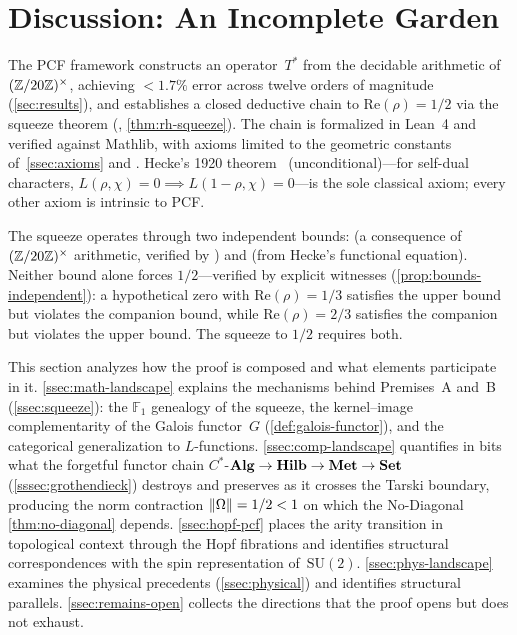 

\section{Discussion: An Incomplete Garden}\label{sec:discussion}

The PCF framework constructs an operator~$T^*$ from the decidable
arithmetic of~$(\mathbb{Z}/20\mathbb{Z})^\times$, achieving ${}<1.7\%$ error across twelve orders of
magnitude (\cref{sec:results}), and establishes a closed
deductive chain to $\mathrm{Re}(\rho)=1/2$ via the squeeze theorem
(, \cref{thm:rh-squeeze}).  The chain is formalized in Lean~4 and verified against Mathlib, with axioms limited to the geometric constants of~\cref{ssec:axioms} and . Hecke's 1920
theorem~\cite{hecke20} (unconditional)---for self-dual
characters, $L(\rho,\chi)=0\implies L(1-\rho,\chi)=0$---is
the sole classical axiom; every other axiom is intrinsic to PCF.

The squeeze operates through two independent bounds: 
(a consequence of $(\mathbb{Z}/20\mathbb{Z})^\times$ arithmetic, verified by ) and
 (from Hecke's functional equation).  Neither
bound alone forces $1/2$---verified by explicit witnesses
(\cref{prop:bounds-independent}): a hypothetical zero with
$\mathrm{Re}(\rho)=1/3$ satisfies the upper bound but violates the
companion bound, while $\mathrm{Re}(\rho)=2/3$ satisfies the companion
but violates the upper bound.  The squeeze to $1/2$ requires both.

This section analyzes how the proof is composed and what elements
participate in it.  \cref{ssec:math-landscape} explains the
mechanisms behind Premises~A and~B (\cref{ssec:squeeze}): the
$\mathbb{F}_1$ genealogy of the squeeze, the kernel--image
complementarity of the Galois functor~$G$
(\cref{def:galois-functor}), and the categorical
generalization to $L$-functions.
\cref{ssec:comp-landscape} quantifies in bits what the forgetful
functor chain $C^*$-$\mathbf{Alg}\to\mathbf{Hilb}\to\mathbf{Met}\to\mathbf{Set}$
(\cref{sssec:grothendieck}) destroys and preserves as it crosses the
Tarski boundary, producing the norm contraction
$\|\Omega\|=1/2<1$ on which the No-Diagonal \cref{thm:no-diagonal}
depends.
\cref{ssec:hopf-pcf} places the arity transition in topological
context through the Hopf fibrations and identifies structural
correspondences with the spin representation of~$\mathrm{SU}(2)$.
\cref{ssec:phys-landscape} examines the physical precedents
(\cref{ssec:physical}) and identifies structural parallels.
\cref{ssec:remains-open} collects the directions that the proof
opens but does not exhaust.


